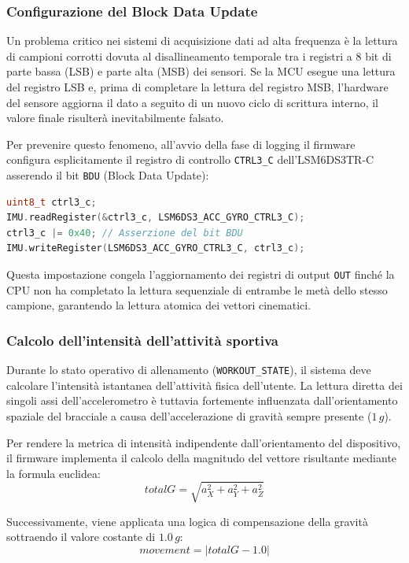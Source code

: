 \subsubsection{Configurazione del Block Data Update}
Un problema critico nei sistemi di acquisizione dati ad alta frequenza è la lettura di campioni corrotti dovuta al disallineamento temporale tra i registri a 8 bit di parte bassa (LSB) e parte alta (MSB) dei sensori.
Se la MCU esegue una lettura del registro LSB e, prima di completare la lettura del registro MSB, l'hardware del sensore aggiorna il dato a seguito di un nuovo ciclo di scrittura interno, il valore finale risulterà inevitabilmente falsato.

Per prevenire questo fenomeno, all'avvio della fase di logging il firmware configura esplicitamente il registro di controllo \texttt{CTRL3\_C} dell'LSM6DS3TR-C asserendo il bit \texttt{BDU} (Block Data Update):

\begin{lstlisting}[language=C++]
uint8_t ctrl3_c;
IMU.readRegister(&ctrl3_c, LSM6DS3_ACC_GYRO_CTRL3_C); 
ctrl3_c |= 0x40; // Asserzione del bit BDU
IMU.writeRegister(LSM6DS3_ACC_GYRO_CTRL3_C, ctrl3_c); 
\end{lstlisting}

Questa impostazione congela l'aggiornamento dei registri di output \texttt{OUT} finché la CPU non ha completato la lettura sequenziale di entrambe le metà dello stesso campione, garantendo la lettura atomica dei vettori cinematici.

\subsubsection{Calcolo dell'intensità dell'attività sportiva}
Durante lo stato operativo di allenamento (\texttt{WORKOUT\_STATE}), il sistema deve calcolare l'intensità istantanea dell'attività fisica dell'utente.
La lettura diretta dei singoli assi dell'accelerometro è tuttavia fortemente influenzata dall'orientamento spaziale del bracciale a causa dell'accelerazione di gravità sempre presente ($1\,g$). 

Per rendere la metrica di intensità indipendente dall'orientamento del dispositivo, il firmware implementa il calcolo della magnitudo del vettore risultante mediante la formula euclidea:
\begin{equation}
    totalG = \sqrt{a_X^2 + a_Y^2 + a_Z^2}
\end{equation}

Successivamente, viene applicata una logica di compensazione della gravità sottraendo il valore costante di $1.0\,g$:
\begin{equation}
    movement = |totalG - 1.0|
\end{equation}

